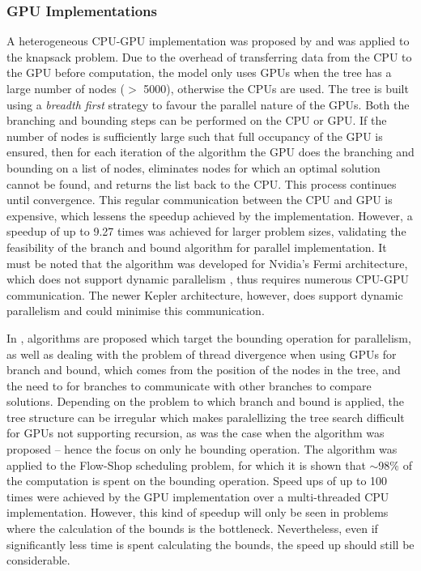 \documentclass[10pt,twocolumn]{article}
\begin{document}
\subsubsection{GPU Implementations } \label{ssec:gpuimp}

A heterogeneous CPU-GPU implementation was proposed by \cite{bouk:2012} and was applied to the knapsack 
problem. Due to the overhead of transferring data from the CPU to the GPU before computation, the model only 
uses GPUs when the tree has a large number of nodes ($>$ 5000), otherwise the CPUs are used. The 
tree is built using a \textit{breadth first} strategy to favour the parallel nature of the GPUs. Both the
branching and bounding steps can be performed on the CPU or GPU. If the number of nodes is sufficiently large
such that full occupancy of the GPU is ensured, then for each iteration of the algorithm the GPU does the
branching and bounding on a list of nodes, eliminates nodes for which an optimal solution cannot be found, and
returns the list back to the CPU. This process continues until convergence. This regular communication between
the CPU and GPU is expensive, which lessens the speedup achieved by the implementation. However, a speedup of 
up to 9.27 times was achieved for larger problem sizes, validating the feasibility of the branch and bound 
algorithm for parallel implementation. It must be noted that the algorithm was developed for Nvidia's Fermi
architecture, which does not support dynamic parallelism \cite{nvidia:2012}, thus requires numerous CPU-GPU 
communication. The newer Kepler architecture, however, does support dynamic parallelism and could minimise
this communication. 

In \cite{melab:2012, chakroun:2012}, algorithms are proposed which target the bounding operation for parallelism,
as well as dealing with the problem of thread divergence when using GPUs for branch and bound, which comes
from the position of the nodes in the tree, and the need to for branches to communicate with other branches to
compare solutions. Depending on the problem to which branch and bound is applied, the tree structure can be
irregular which makes paralellizing the tree search difficult for GPUs not supporting recursion, as was the 
case when the algorithm was proposed -- hence the focus on only he bounding operation. The algorithm was 
applied to the Flow-Shop scheduling problem, for which it is shown that $\mathit{\sim}$98$\%$ of the 
computation is spent on the bounding operation. Speed ups of up to 100 times were achieved by the GPU 
implementation over a multi-threaded CPU implementation. However, this kind of speedup will only be seen in 
problems where the calculation of the bounds is the bottleneck. Nevertheless, even if significantly less 
time is spent calculating the bounds, the speed up should still be considerable.
\end{document}
